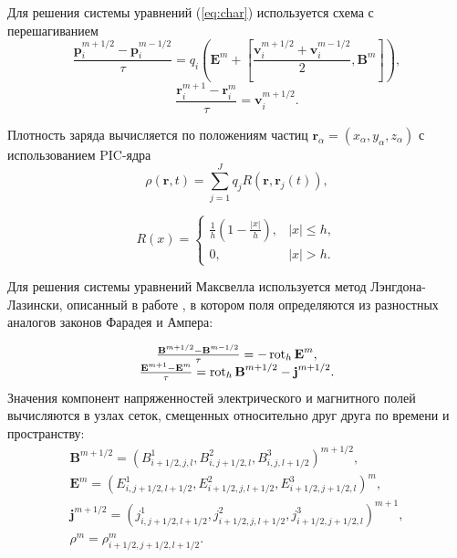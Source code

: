 Для решения системы уравнений (\ref{eq:char}) используется схема с перешагиванием
$$
\frac{{\textbf{p}}^{m+1/2}_{i}-{\textbf{p}}^{m-1/2}_{i}}{\tau}=q_{i}\left({\textbf{E}}^m+\left[\frac{{\textbf{v}}^{m+1/2}_{i}+{\textbf{v}}^{m-1/2}_{i}}{2},{\textbf{B}}^m \right] \right),
$$
$$
\frac{{\textbf{r}}_{i}^{m+1}-{\textbf{r}}_{i}^{m}}{\tau}={\textbf{v}}^{m+1/2}_{i}.
$$


Плотность заряда вычисляется по положениям частиц ${\textbf{r}}_\alpha=(x_\alpha,y_\alpha,z_\alpha)$ с использованием PIC-ядра 
$$
\rho({\textbf{r}}, t)=\sum_{j=1}^J q_{j} R({\textbf{r}}, {\textbf{r}}_{j}(t)),
$$

\begin{equation}
R(x)=\left\{
\begin{array}{ll}
\displaystyle \frac{1}{h}\left(1-\frac{|x|}{h}\right), & |x|\leq h, \\ 0, & |x|>h.
\end{array} \right.
\end{equation}

Для решения системы уравнений Максвелла используется метод Лэнгдона-Лазински, описанный в работе \cite{lasin}, в котором поля определяются из разностных аналогов законов Фарадея и Ампера:

\begin{equation}
\begin{array}{c}
\frac{{\textbf{B}}^{m+1/2}-{\textbf{B}}^{m-1/2}}{\tau}=-\mathop{\mathrm{rot}}\nolimits_h {\textbf{E}}^m,
\\
\frac{{\textbf{E}}^{m+1}-{\textbf{E}}^m}{\tau}=\mathop{\mathrm{rot}}\nolimits_h {\textbf{B}}^{m+1/2} - {\textbf{j}}^{m+1/2}.
\end{array}
\label{FDTD}
\end{equation}
Значения компонент напряженностей электрического и магнитного полей вычисляются в узлах сеток, смещенных относительно друг друга по времени и пространству:
\begin{equation}
\label{eq:BE}
\begin{array}{c}


{\textbf{B}}^{m+1/2}=(B^1_{i+1/2,j,l}, B^2_{i,j+1/2,l}, B^3_{i,j,l+1/2})^{m+1/2},
\\
{\textbf{E}}^{m}=(E^1_{i,j+1/2,l+1/2}, E^2_{i+1/2,j,l+1/2}, E^3_{i+1/2,j+1/2,l})^m,
\\
{\textbf{j}}^{m+1/2}=(j^1_{i,j+1/2,l+1/2},j^2_{i+1/2,j,l+1/2},j^3_{i+1/2,j+1/2,l})^{m+1},
\\
\rho^m=\rho^m_{i+1/2,j+1/2,l+1/2}. 
\end{array}
\end{equation}

